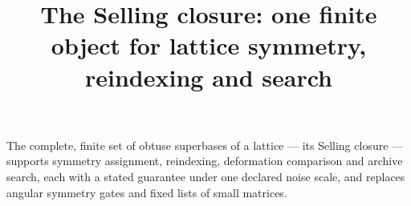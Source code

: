 \documentclass[preprint,pdf]{iucr}          %
\begin{document}

\title{The Selling closure: one finite object for lattice symmetry, reindexing and search}



\maketitle                        %

\begin{synopsis}
The complete, finite set of obtuse superbases of a lattice --- its Selling closure --- supports symmetry assignment, reindexing, deformation comparison and archive search, each with a stated guarantee under one declared noise scale, and replaces angular symmetry gates and fixed lists of small matrices.
\end{synopsis}
\end{document}
